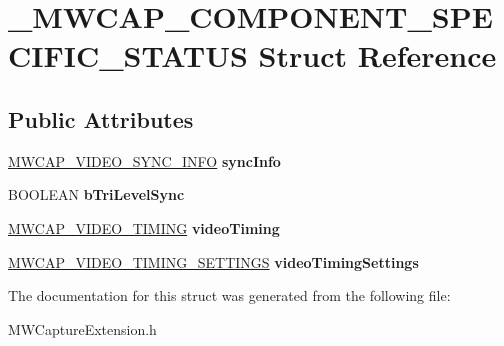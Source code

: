 \hypertarget{struct__MWCAP__COMPONENT__SPECIFIC__STATUS}{\section{\-\_\-\-M\-W\-C\-A\-P\-\_\-\-C\-O\-M\-P\-O\-N\-E\-N\-T\-\_\-\-S\-P\-E\-C\-I\-F\-I\-C\-\_\-\-S\-T\-A\-T\-U\-S Struct Reference}
\label{struct__MWCAP__COMPONENT__SPECIFIC__STATUS}
}
\subsection*{Public Attributes}
\begin{DoxyCompactItemize}
\item 
\hypertarget{struct__MWCAP__COMPONENT__SPECIFIC__STATUS_a435f654b07cca47a2cbe64d81092dc45}{\hyperlink{struct__MWCAP__VIDEO__SYNC__INFO}{M\-W\-C\-A\-P\-\_\-\-V\-I\-D\-E\-O\-\_\-\-S\-Y\-N\-C\-\_\-\-I\-N\-F\-O} {\bfseries sync\-Info}}\label{struct__MWCAP__COMPONENT__SPECIFIC__STATUS_a435f654b07cca47a2cbe64d81092dc45}

\item 
\hypertarget{struct__MWCAP__COMPONENT__SPECIFIC__STATUS_a0c32ac116552e42305527760dd244476}{B\-O\-O\-L\-E\-A\-N {\bfseries b\-Tri\-Level\-Sync}}\label{struct__MWCAP__COMPONENT__SPECIFIC__STATUS_a0c32ac116552e42305527760dd244476}

\item 
\hypertarget{struct__MWCAP__COMPONENT__SPECIFIC__STATUS_ae9e14087f00b23b6e26e927187f184a4}{\hyperlink{struct__MWCAP__VIDEO__TIMING}{M\-W\-C\-A\-P\-\_\-\-V\-I\-D\-E\-O\-\_\-\-T\-I\-M\-I\-N\-G} {\bfseries video\-Timing}}\label{struct__MWCAP__COMPONENT__SPECIFIC__STATUS_ae9e14087f00b23b6e26e927187f184a4}

\item 
\hypertarget{struct__MWCAP__COMPONENT__SPECIFIC__STATUS_a9db638a5a2ca8936676fb571e322c25b}{\hyperlink{struct__MWCAP__VIDEO__TIMING__SETTINGS}{M\-W\-C\-A\-P\-\_\-\-V\-I\-D\-E\-O\-\_\-\-T\-I\-M\-I\-N\-G\-\_\-\-S\-E\-T\-T\-I\-N\-G\-S} {\bfseries video\-Timing\-Settings}}\label{struct__MWCAP__COMPONENT__SPECIFIC__STATUS_a9db638a5a2ca8936676fb571e322c25b}

\end{DoxyCompactItemize}


The documentation for this struct was generated from the following file\-:\begin{DoxyCompactItemize}
\item 
M\-W\-Capture\-Extension.\-h\end{DoxyCompactItemize}
